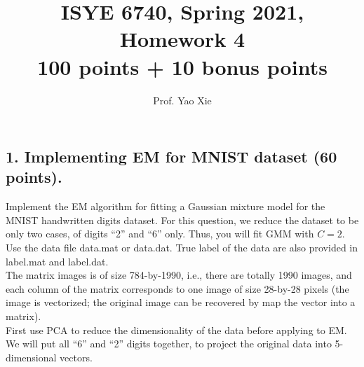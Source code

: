 \documentclass[12pt]{article}
\begin{document}
\title{ISYE 6740, Spring 2021, Homework 4\\{\small 100 points + 10 bonus points}}
\author{Prof. Yao Xie}
\date{}
\maketitle



\subsection*{1. Implementing EM for MNIST dataset (60 points).}

Implement the EM algorithm for fitting a Gaussian mixture model for the MNIST handwritten digits dataset. For this question, we reduce the dataset to be only two cases, of digits ``2'' and ``6'' only. Thus, you will fit GMM with $C = 2$. Use the data file \textsf{data.mat} or \textsf{data.dat}. True label of the data are also provided in \textsf{label.mat} and \textsf{label.dat}.
\\


The matrix \textsf{images} is of size 784-by-1990, i.e., there are totally 1990 images, and each column of the matrix corresponds to one image of size 28-by-28 pixels (the image is vectorized; the original image can be recovered by map the vector into a matrix).  \\

First use PCA to reduce the dimensionality of the data before applying to EM. We will put all ``6'' and ``2'' digits together, to project the original data into 5-dimensional vectors. \\
\end{document}
